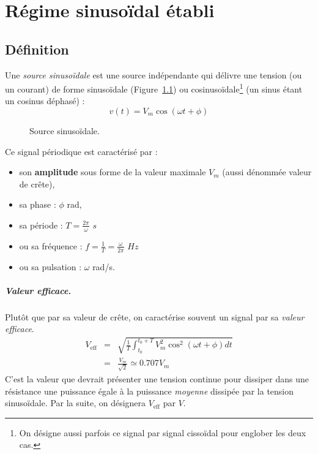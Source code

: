 
\chapter{Régime sinusoïdal établi}
\label{sec:sinusoidal}

\section{Définition}

Une \textit{source sinusoïdale} est une source indépendante qui délivre une tension (ou un courant) de forme sinusoïdale (Figure~\ref{fig:sin}) ou cosinusoïdale\footnote{On désigne aussi parfois ce signal par signal cissoïdal pour englober les deux cas.} (un sinus étant un cosinus déphasé) :
		\[v(t)=V_m\cos(\omega t +\phi)\]
\begin{figure}[h]
\centering
{}
\caption{Source sinusoïdale.\label{fig:sin}}
\end{figure}

Ce signal périodique est caractérisé par : 
\begin{itemize}
	\item son {\bf  amplitude} sous forme de la valeur maximale $V_m$ (aussi dénommée valeur de crête),
	\item sa phase : $\phi$ rad,
	\item sa période : $T=\frac{2\pi}{\omega}$ $s$
	\item ou sa fréquence : $f=\frac{1}{T}=\frac{\omega}{2\pi}$ $Hz$
	\item ou sa pulsation : $\omega$ rad/s.
\end{itemize}

\paragraph{Valeur efficace.} 
Plutôt que par sa valeur de crête, on caractérise souvent un signal par sa \textit{valeur efficace}.
\begin{eqnarray*}
	V_{\text {eff}}& =&\sqrt{\frac{1}{T}\int_{t_0}^{t_0+T}V_m^2\cos^2(\omega t + \phi)dt}\\
	& = & \frac{V_m}{\sqrt{2}} \simeq 0.707 V_m
\end{eqnarray*}
C'est la valeur que devrait présenter une tension continue pour dissiper dans
une résistance une puissance égale à la puissance {\em moyenne}
dissipée par la tension sinusoïdale.
 Par la suite, on désignera $V_{\text{eff}}$ par $V$.

